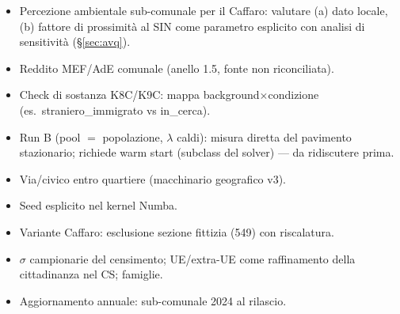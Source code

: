 \documentclass[11pt,a4paper]{article}
\begin{document}
\begin{itemize}[leftmargin=*,itemsep=1pt]
  \item[$\square$] Percezione ambientale sub-comunale per il Caffaro:
  valutare (a) dato locale, (b) fattore di prossimit\`a al SIN come
  parametro esplicito con analisi di sensitivit\`a (\S\ref{sec:avq}).
  \item[$\square$] Reddito MEF/AdE comunale (anello 1.5, fonte non
  riconciliata).
  \item[$\square$] Check di sostanza K8C/K9C: mappa
  background$\times$condizione (es.\ straniero\_immigrato vs in\_cerca).
  \item[$\square$] Run B (pool $=$ popolazione, $\lambda$ caldi): misura
  diretta del pavimento stazionario; richiede warm start (subclass del
  solver) --- da ridiscutere prima.
  \item[$\square$] Via/civico entro quartiere (macchinario geografico v3).
  \item[$\square$] Seed esplicito nel kernel Numba.
  \item[$\square$] Variante Caffaro: esclusione sezione fittizia (549) con
  riscalatura.
  \item[$\square$] $\sigma$ campionarie del censimento; UE/extra-UE come
  raffinamento della cittadinanza nel CS; famiglie.
  \item[$\square$] Aggiornamento annuale: sub-comunale 2024 al rilascio.
\end{itemize}
\end{document}
